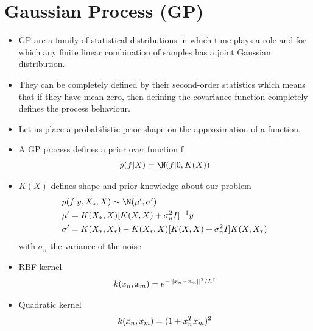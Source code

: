 \section{Gaussian Process (GP)}
\begin{itemize}
    \item GP are a family of statistical distributions in which time plays a role and for which any finite linear combination of samples has a joint Gaussian distribution.
    \item They can be completely defined by their second-order statistics which means that if they have mean zero, then defining the covariance function completely defines the process behaviour.
    \item Let us place a probabilistic prior shape on the approximation of a function.
    \item A GP process defines a prior over function f
    \begin{align*}
        p(\*f | X) = \N(\*f | \*0, K(X))
    \end{align*}
    \item $K(X)$ defines shape and prior knowledge about our problem
    \begin{align*}
        &p(\*f | \*y, \*X_*, \*X) \sim \N(\mu', \sigma')\\
        & \mu' = K(\*X_*, \*X)[K(\*X,\*X) + \sigma_n^2 I]^{-1}\*y\\
        & \*\sigma' = K(\*X_*, \*X_*) - K(\*X_*, \*X)[K(\*X, \*X) + \sigma_n^2 I] K(\*X, \*X_*)
    \end{align*}
    with $\sigma_n$ the variance of the noise
    \item RBF kernel
    \begin{align*}
         k(\*x_n, \*x_m) = e^{-|| \*x_n - \*x_m||^2 / L^2}
     \end{align*} 
     \item Quadratic kernel 
     \begin{align*}
         k(\*x_n, \*x_m) = (1 + \*x_n^T \*x_m)^2
     \end{align*}
\end{itemize}

